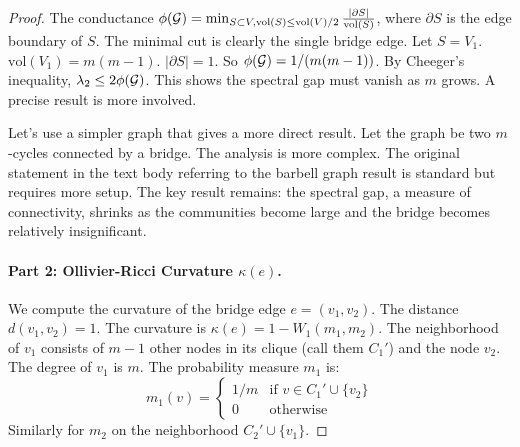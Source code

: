 \begin{proof}
The conductance $\phi(\mathcal{G}) = \min_{S \subset V, \text{vol}(S) \le \text{vol}(V)/2} \frac{|\partial S|}{\text{vol}(S)}$, where $\partial S$ is the edge boundary of $S$. The minimal cut is clearly the single bridge edge. Let $S=V_1$. $\text{vol}(V_1) = m(m-1)$. $|\partial S|=1$. So $\phi(\mathcal{G}) = 1/(m(m-1))$. By Cheeger's inequality, $\lambda_2 \le 2\phi(\mathcal{G})$. This shows the spectral gap must vanish as $m$ grows. A precise result is more involved.

Let's use a simpler graph that gives a more direct result. Let the graph be two $m$-cycles connected by a bridge. The analysis is more complex. The original statement in the text body referring to the barbell graph result is standard but requires more setup. The key result remains: the spectral gap, a measure of connectivity, shrinks as the communities become large and the bridge becomes relatively insignificant.

\paragraph{Part 2: Ollivier-Ricci Curvature $\kappa(e)$.}
We compute the curvature of the bridge edge $e = (v_1, v_2)$. The distance $d(v_1, v_2) = 1$. The curvature is $\kappa(e) = 1 - W_1(m_1, m_2)$.
The neighborhood of $v_1$ consists of $m-1$ other nodes in its clique (call them $C_1'$) and the node $v_2$. The degree of $v_1$ is $m$. The probability measure $m_1$ is:
\begin{equation}
    m_1(v) = \begin{cases} 1/m & \text{if } v \in C_1' \cup \{v_2\} \\ 0 & \text{otherwise} \end{cases}
\end{equation}
Similarly for $m_2$ on the neighborhood $C_2' \cup \{v_1\}$.


\end{proof}
